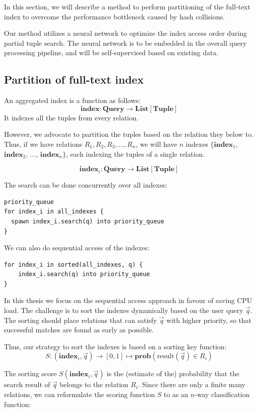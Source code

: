 In this section, we will describe a method to perform partitioning of the full-text index to overcome the performance bottleneck caused by hash collisions.

Our method utilizes a neural network to optimize the index access order during partial tuple search.  The neural network is to be embedded in the overall query processing pipeline, and will be self-supervised based on existing data.

\subsection{Partition of full-text index}
\label{subsection:partition_text_index}
An aggregated index is a function as follows:
$$\mathbf{index} : \mathbf{Query} \to \mathbf{List}[\mathbf{Tuple}]$$
It indexes all the tuples from every relation.

However, we advocate to partition the tuples based on the relation they below to.  Thus,
if we have relations $R_1, R_2, R_3, \dots, R_n$, we will have $n$ indexes
$\{\mathbf{index}_1$, $\mathbf{index}_2$, $\dots$, $\mathbf{index}_n\}$, each indexing the tuples
of a single relation.

$$\mathbf{index}_i : \mathbf{Query} \to \mathbf{List}[\mathbf{Tuple}]$$

The search can be done concurrently over all indexes:

\begin{verbatim}
priority_queue
for index_i in all_indexes {
  spawn index_i.search(q) into priority_queue
}
\end{verbatim}

We can also do sequential access of the indexes:

\begin{verbatim}
for index_i in sorted(all_indexes, q) {
    index_i.search(q) into priority_queue
}
\end{verbatim}

In this thesis we focus on the sequential access approach in favour of saving CPU load.
The challenge is to sort the indexes dynamically based on the user query $\vec q$.
The sorting should place relations that can satisfy $\vec q$ with higher priority, so that
successful matches are found as early as possible.

Thus, our strategy to sort the indexes is based on a sorting key function:
$$
S : (\mathbf{index}_i, \vec q) \to [0, 1] \mapsto \mathbf{prob}(\mathrm{result}(\vec q) \in R_i)
$$

The sorting score $S(\mathbf{index}_i, \vec q)$ is the (estimate of the) probability that the search
result of $\vec q$ belongs to the relation $R_i$.  Since there are only a finite many relations,
we can reformulate the scoring function $S$ to as an $n$-way classification function:

